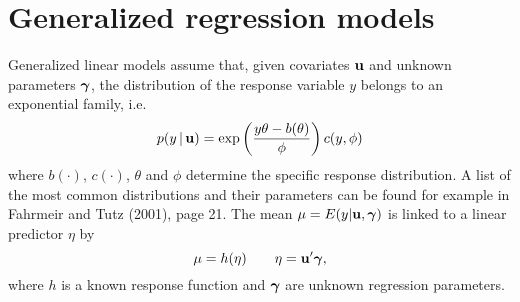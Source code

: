\documentclass[11pt,a4paper,twoside]{bayesxarticle}
\begin{document}
\section{Generalized regression models}
\label{obsmodel}

Generalized linear models assume that, given covariates $\mathbf{u}$ and
unknown parameters $\boldsymbol{\gamma}$, the distribution of the response
variable $y$ belongs to an exponential family, i.e.
\begin{equation}
\label{likel} p(y \, | \, \uvec) = \exp \left( \frac{y \theta -
b(\theta)}{\phi} \right) c(y,\phi)
\end{equation}
where $b(\cdot)$, $c(\cdot)$, $\theta$ and $\phi$ determine the
specific response distribution. A list of the most common
distributions and their parameters can be found for example in
Fahrmeir and Tutz (2001), page 21. The mean $\mu=E(y|\mathbf{u},\boldsymbol{\gamma})$ is
linked to a linear predictor $\eta$ by
\begin{equation}
\label{glm} \mu=h(\eta) \qquad \eta= \uvec'\gammavec,
\end{equation}
where $h$ is a known response function and $\boldsymbol{\gamma}$ are unknown
regression parameters.
\end{document}
